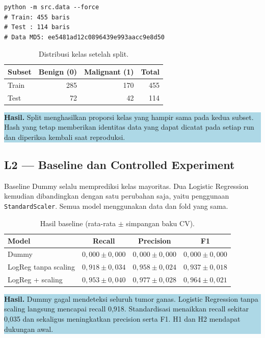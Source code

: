\documentclass[11pt,a4paper]{article}
\newcommand{\resultbox}[1]{%
  \begin{center}
    \colorbox{lightblue}{\parbox{0.91\linewidth}{\textbf{Hasil.} #1}}
  \end{center}
}
\begin{document}
\begin{lstlisting}[style=terminal]
python -m src.data --force
# Train: 455 baris
# Test : 114 baris
# Data MD5: ee5481ad12c0896439e993aacc9e8d50
\end{lstlisting}

\begin{table}[ht]
\centering
\caption{Distribusi kelas setelah split.}
\begin{tabular}{lrrr}
\toprule
Subset & Benign (0) & Malignant (1) & Total \\
\midrule
Train & 285 & 170 & 455 \\
Test  & 72  & 42  & 114 \\
\bottomrule
\end{tabular}
\end{table}

\resultbox{Split menghasilkan proporsi kelas yang hampir sama pada kedua subset. Hash yang tetap memberikan identitas data yang dapat dicatat pada setiap run dan diperiksa kembali saat reproduksi.}

\subsection{L2 --- Baseline dan Controlled Experiment}

Baseline Dummy selalu memprediksi kelas mayoritas. Dua Logistic Regression kemudian dibandingkan dengan satu perubahan saja, yaitu penggunaan \texttt{StandardScaler}. Semua model menggunakan data dan fold yang sama.

\begin{table}[ht]
\centering
\caption{Hasil baseline (rata-rata $\pm$ simpangan baku CV).}
\begin{tabular}{lccc}
\toprule
Model & Recall & Precision & F1 \\
\midrule
Dummy & $0{,}000 \pm 0{,}000$ & $0{,}000 \pm 0{,}000$ & $0{,}000 \pm 0{,}000$ \\
LogReg tanpa scaling & $0{,}918 \pm 0{,}034$ & $0{,}958 \pm 0{,}024$ & $0{,}937 \pm 0{,}018$ \\
LogReg + scaling & $0{,}953 \pm 0{,}040$ & $0{,}977 \pm 0{,}028$ & $0{,}964 \pm 0{,}021$ \\
\bottomrule
\end{tabular}
\end{table}

\resultbox{Dummy gagal mendeteksi seluruh tumor ganas. Logistic Regression tanpa scaling langsung mencapai recall 0,918. Standardisasi menaikkan recall sekitar 0,035 dan sekaligus meningkatkan precision serta F1. H1 dan H2 mendapat dukungan awal.}
\end{document}
